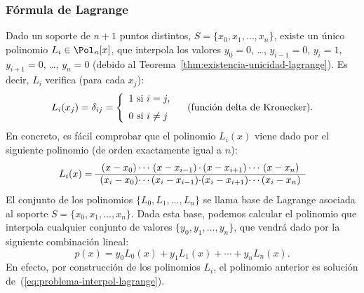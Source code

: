 \subsubsection{Fórmula de Lagrange}
Dado un soporte de $n+1$ puntos distintos, $S=\{x_0,x_1,\dots,x_n\}$,
existe un único polinomio $L_i\in \Pol_n[x]$, que interpola los
valores $y_0=0$, \dots, $y_{i-1}=0$, $y_i=1$, $y_{i+1}=0$, \dots,
$y_n=0$ (debido al Teorema~\ref{thm:existencia-unicidad-lagrange}). Es
decir, $L_i$ verifica (para cada $x_j$):
\begin{equation}
  L_i(x_j)= \delta_{ij} =
  \left\{\begin{array}{l}
           1 \text{ si } i=j, \\\noalign{\medskip} 0 \text{ si } i\neq j
         \end{array}\right. \quad \text{(función delta de Kronecker).}
\end{equation}
En concreto, es fácil comprobar que el polinomio $L_i(x)$ viene dado
por el siguiente polinomio (de orden exactamente igual a $n$):
\begin{equation}
  L_i(x)=
  \begin{array}{c@{}c@{}c@{}c@{}c@{}c@{}c}
    (x-x_0) & \cdots & (x-x_{i-1}) & \cdot & (x-x_{i+1}) & \cdots &
                                                                    (x-x_n)
    \\ \hline
    (x_i-x_0) & \cdots & (x_i-x_{i-1}) & \cdot & (x_i-x_{i+1}) & \cdots &
                                                                          (x_i-x_n)
  \end{array}
\end{equation}
El conjunto de los polinomios $\{ L_0, L_1,\dots, L_n \}$ se llama
base de Lagrange asociada al soporte $S=\{x_0,x_1,\dots,x_n\}$.  Dada
esta base, podemos calcular el polinomio que interpola cualquier
conjunto de valores $\{y_0,y_1,\dots,y_n\}$, que vendrá dado por la
siguiente combinación lineal:
\begin{equation}
  p(x)= y_0L_0(x) + y_1 L_1(x) + \cdots + y_n L_n(x).
\end{equation}
En efecto, por construcción de los polinomios $L_i$, el polinomio anterior
es solución de~(\ref{eq:problema-interpol-lagrange}).

